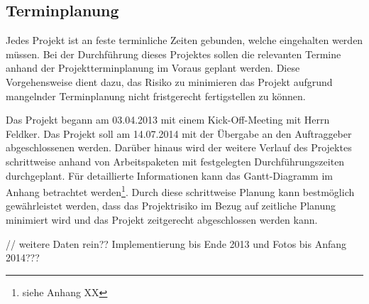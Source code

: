 \subsection{Terminplanung}
\label{sec:Terminplanung}

Jedes Projekt ist an feste terminliche Zeiten gebunden, welche eingehalten werden müssen. Bei der Durchführung dieses 
Projektes sollen die relevanten Termine anhand der Projektterminplanung im Voraus geplant werden. Diese Vorgehensweise 
dient dazu, das Risiko zu minimieren das Projekt aufgrund mangelnder Terminplanung nicht fristgerecht fertigstellen zu 
können. 

Das Projekt begann am 03.04.2013 mit einem Kick-Off-Meeting mit Herrn Feldker. Das Projekt 
soll am 14.07.2014 mit der Übergabe an den Auftraggeber abgeschlossenen werden. Darüber hinaus wird 
der weitere Verlauf des Projektes schrittweise anhand von 
Arbeitspaketen mit festgelegten Durchführungszeiten durchgeplant. Für detaillierte Informationen kann das Gantt-Diagramm 
im Anhang betrachtet werden\footnote{siehe Anhang XX}.
Durch diese schrittweise Planung kann bestmöglich gewährleistet werden, dass das  Projektrisiko im Bezug auf zeitliche 
Planung minimiert wird und das Projekt zeitgerecht abgeschlossen werden kann.

// weitere Daten rein?? Implementierung bis Ende 2013 und Fotos bis Anfang 2014???